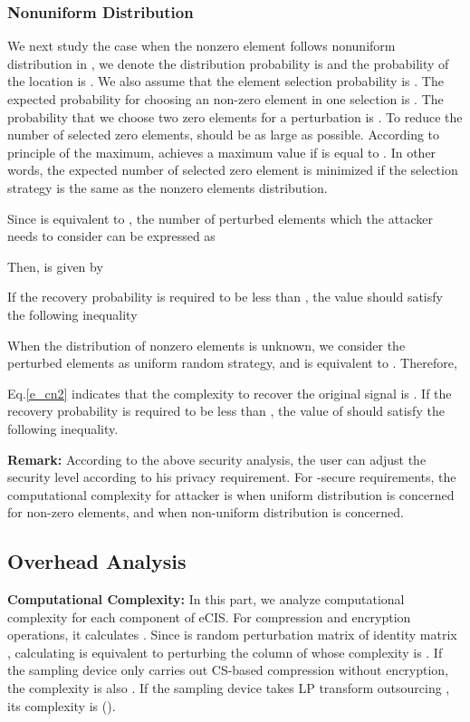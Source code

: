 \documentclass[conference]{IEEEtran}
\begin{document}
\subsubsection{Nonuniform Distribution}
We next study the case when  the nonzero element follows nonuniform distribution in , we denote the distribution probability is  and the probability of the  location is . We also assume that the element selection probability is . The expected probability  for choosing an non-zero element in one selection is
 . The probability that we choose  two zero elements for a perturbation is   . To reduce the number of selected zero elements,  should be as large as possible. According to principle of the maximum,  achieves a maximum value  if  is equal to . In other words, the expected number of selected zero element is minimized if the selection strategy is the same as the nonzero elements distribution.

Since  is equivalent to ,  the number of perturbed elements which the attacker needs to consider  can be expressed as

Then,   is given by

If the recovery probability is required to be less than , the value  should satisfy the following inequality


When the distribution of nonzero elements is unknown, we consider the perturbed elements as uniform random strategy, and  is equivalent to  . Therefore,

Eq.\ref{e_cn2} indicates  that the complexity to recover  the original signal is .
If the recovery probability is required to be less than , the value of  should satisfy the following inequality.


\textbf{Remark:} According to the above security analysis, the user can adjust the security level  according to his privacy requirement. For -secure requirements, the computational complexity for attacker is  when uniform distribution is concerned for non-zero elements, and  when non-uniform distribution is concerned.

\subsection{Overhead Analysis}
\textbf{Computational Complexity:}
In this part, we analyze computational complexity for each component of eCIS. For compression and encryption operations, it calculates . Since  is random perturbation matrix of identity matrix , calculating  is equivalent to perturbing the column of  whose  complexity is . If the sampling device only carries out CS-based compression without encryption, the  complexity is also . If the sampling device takes LP transform outsourcing \cite{wang2014privacy}, its complexity is  ().
\end{document}
